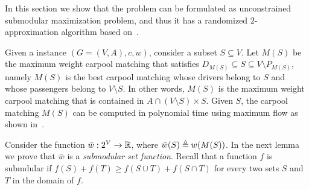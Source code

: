 
In this section we show that the \carpool problem can be formulated as
unconstrained submodular maximization problem, and thus it has a
randomized $2$-approximation algorithm based on~\cite{BFNS15}.

Given a \carpool instance $(G = (V,A), c, w)$, consider a subset
$S \subseteq V$.  Let $M(S)$ be the maximum weight carpool matching
that satisfies $D_{M(S)} \subseteq S \subseteq V \setminus P_{M(S)}$,
namely $M(S)$ is the best carpool matching whose drivers belong to $S$
and whose passengers belong to $V \setminus S$.  In other words,
$M(S)$ is the maximum weight carpool matching that is contained in
$A \cap (V \setminus S) \times S$.
%
Given $S$, the carpool matching $M(S)$ can be computed in polynomial
time using maximum flow as shown in~\cite{??}.

Consider the function $\bar{w}: 2^V \to \mathbb{R}$, where $\bar{w}(S) \triangleq
w(M(S))$.  In the next lemma we prove that $\bar{w}$ is
a \emph{submodular set function}.  Recall that a function $f$ is
submdular if $f(S) + f(T) \geq f(S \cup T) + f(S \cap T)$ for every
two sets $S$ and $T$ in the domain of $f$.

